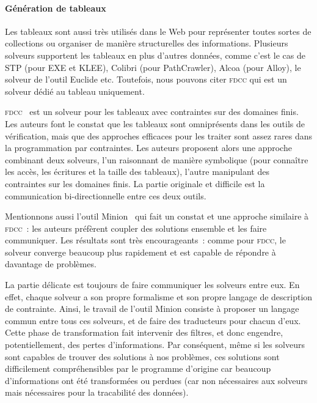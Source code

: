\paragraph{Génération de tableaux} Les tableaux sont aussi très utilisés dans le
Web pour représenter toutes sortes de collections ou organiser de manière
structurelles des informations. Plusieurs solveurs supportent les tableaux en
plus d'autres données, comme c'est le cas de STP (pour EXE et KLEE), Colibri
(pour PathCrawler), Alcoa (pour Alloy), le solveur de l'outil Euclide etc.
Toutefois, nous pouvons citer {\scshape fdcc} qui est un solveur dédié au
tableau uniquement.

{\scshape fdcc}~ est un solveur pour les tableaux avec
contraintes sur des domaines finis. Les auteurs font le constat que les tableaux
sont omniprésents dans les outils de vérification, mais que des approches
efficaces pour les traiter sont assez rares dans la programmation par
contraintes. Les auteurs proposent alors une approche combinant deux solveurs,
l'un raisonnant de manière symbolique (pour connaître les accès, les écritures
et la taille des tableaux), l'autre manipulant des contraintes sur les domaines
finis. La partie originale et difficile est la communication bi-directionnelle
entre ces deux outils.

Mentionnons aussi l'outil Minion~ qui fait un constat et une
approche similaire à {\scshape fdcc}~: les auteurs préfèrent coupler des
solutions ensemble et les faire communiquer. Les résultats sont très
encourageants~: comme pour {\scshape fdcc}, le solveur converge beaucoup plus
rapidement et est capable de répondre à davantage de problèmes.

La partie délicate est toujours de faire communiquer les solveurs entre eux. En
effet, chaque solveur a son propre formalisme et son propre langage de
description de contrainte. Ainsi, le travail de l'outil Minion consiste à
proposer un langage commun entre tous ces solveurs, et de faire des traducteurs
pour chacun d'eux. Cette phase de transformation fait intervenir des filtres, et
donc engendre, potentiellement, des pertes d'informations. Par conséquent, même
si les solveurs sont capables de trouver des solutions à nos problèmes, ces
solutions sont difficilement compréhensibles par le programme d'origine car
beaucoup d'informations ont été transformées ou perdues (car non nécessaires aux
solveurs mais nécessaires pour la tracabilité des données).
